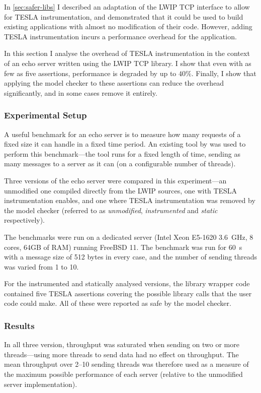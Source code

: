 In \autoref{sec:safer-libs} I described an adaptation of the LWIP TCP interface
to allow for TESLA instrumentation, and demonstrated that it could be used to
build existing applications with almost no modification of their code. However,
adding TESLA instrumentation incurs a performance overhead for the application.

In this section I analyse the overhead of TESLA instrumentation in the context
of an echo server written using the LWIP TCP library. I show that even with as
few as five assertions, performance is degraded by up to $40\%$. Finally, I show
that applying the model checker to these assertions can reduce the overhead
significantly, and in some cases remove it entirely.

\subsubsection{Experimental Setup}

A useful benchmark for an echo server is to measure how many requests of a fixed
size it can handle in a fixed time period. An existing tool by
\textcite{hoyer_rust_2016} was used to perform this benchmark---the tool runs
for a fixed length of time, sending as many messages to a server as it can (on a
configurable number of threads).

Three versions of the echo server were compared in this experiment---an
unmodified one compiled directly from the LWIP sources, one with TESLA
instrumentation enables, and one where TESLA instrumentation was removed by the
model checker (referred to as \emph{unmodified}, \emph{instrumented} and
\emph{static} respectively).

The benchmarks were run on a dedicated server (Intel Xeon E5-1620
\SI{3.6}{\GHz}, 8 cores, 64GB of RAM) running FreeBSD 11. The benchmark was run
for \SI{60}{\s} with a message size of 512 bytes in every case, and the number
of sending threads was varied from 1 to 10.

For the instrumented and statically analysed versions, the library wrapper code
contained five TESLA assertions covering the possible library calls that the
user code could make. All of these were reported as safe by the model checker.

\subsubsection{Results}

In all three version, throughput was saturated when sending on two or more
threads---using more threads to send data had no effect on throughput. The mean
throughput over 2--10 sending threads was therefore used as a measure of the
maximum possible performance of each server (relative to the unmodified server
implementation). 

